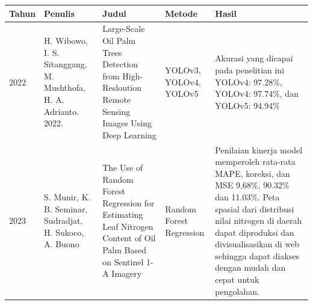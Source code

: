 \begin{singlespace}
	\begin{table}[H]
		\centering
		\begin{tabular}{|p{2cm}|p{2cm}|p{2cm}|p{2cm}|p{2cm}|}	
			\hline
			Tahun & Penulis & Judul & Metode & Hasil \\ \hline
			2022  & H. Wibowo, I. S. Sitanggang, M. Mushthofa, H. A. Adrianto. 2022.       & Large-Scale Oil Palm Trees Detection from High-Resloution Remote Sensing Images Using Deep Learning                                                  & YOLOv3, YOLOv4, YOLOv5                                                                                                                                                          & Akurasi yang dicapai pada penelitian ini YOLOv4: 97.28\%, YOLOv4: 97.74\%, dan YOLOv5: 94.94\%                                                                                                                                                                                                                    \\ \hline
			2023  & S. Munir, K. B. Seminar, Sudradjat, H. Sukoco, A. Buono                & The Use of Random Forest Regression for Estimating Leaf Nitrogen Content of Oil Palm Based on Sentinel 1-A Imagery                                   & Random Forest Regression                                                                                                                                                        & Penilaian kinerja model memperoleh rata-rata MAPE, koreksi, dan MSE 9,68\%, 90.32\% dan 11.03\%. Peta spasial dari distribusi nilai nitrogen di daerah dapat diproduksi dan divisualisasikan di web sehingga dapat diakses dengan mudah dan cepat untuk pengolahan.                                               \\ \hline
		\end{tabular}
	\end{table}
\end{singlespace}
